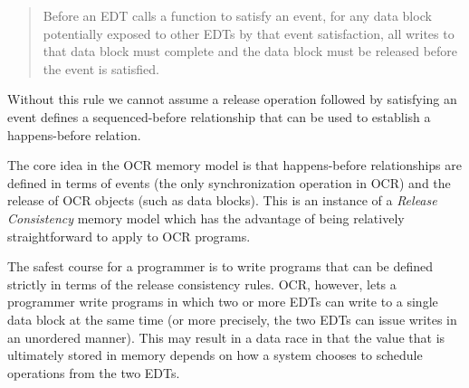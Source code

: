 %
%
%
%
%

\begin{quote}
Before an EDT calls a function to satisfy an event,
for any data block potentially exposed to other EDTs
by that event satisfaction, all writes to that data block must complete
and the data block must be released before the event is satisfied.
\end{quote}

Without this rule we cannot assume a release operation followed by
satisfying an event defines a sequenced-before relationship that can
be used to establish a happens-before relation.

The core idea in the OCR memory model is that happens-before
relationships are defined in terms of events (the only synchronization
operation in OCR) and the release of OCR objects (such as data
blocks). This is an instance of a \emph{Release
Consistency} memory model which has the
advantage of being relatively straightforward to apply to OCR
programs.

The safest course for a programmer is to write programs that can be
defined strictly in terms of the release consistency rules. OCR,
however, lets a programmer write programs in which two or more EDTs can
write to a single data block at the same time (or more precisely, the
two EDTs can issue writes in an unordered manner). This may result in a
data race in that the value that is ultimately stored
in memory depends on how a system chooses to schedule operations from
the two EDTs.

